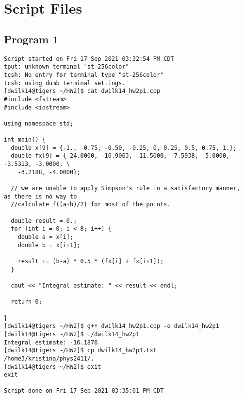\documentclass{article}
\begin{document}
\section*{Script Files}
\subsection*{Program 1}
\begin{verbatim}
Script started on Fri 17 Sep 2021 03:32:54 PM CDT
tput: unknown terminal "st-256color"
tcsh: No entry for terminal type "st-256color"
tcsh: using dumb terminal settings.
[dwilk14@tigers ~/HW2]$ cat dwilk14_hw2p1.cpp
#include <fstream>
#include <iostream>

using namespace std;

int main() {
  double x[9] = {-1., -0.75, -0.50, -0.25, 0, 0.25, 0.5, 0.75, 1.};
  double fx[9] = {-24.0000, -16.9063, -11.5000, -7.5938, -5.0000, -3.5313, -3.0000, \
    -3.2188, -4.0000};

  // we are unable to apply Simpson's rule in a satisfactory manner, as there is no way to 
  //calculate f((a+b)/2) for most of the points.

  double result = 0.;
  for (int i = 0; i < 8; i++) {
    double a = x[i];
    double b = x[i+1];

    result += (b-a) * 0.5 * (fx[i] + fx[i+1]);
  }

  cout << "Integral estimate: " << result << endl;

  return 0;

}
[dwilk14@tigers ~/HW2]$ g++ dwilk14_hw2p1.cpp -o dwilk14_hw2p1
[dwilk14@tigers ~/HW2]$ ./dwilk14_hw2p1
Integral estimate: -16.1876
[dwilk14@tigers ~/HW2]$ cp dwilk14_hw2p1.txt /home3/kristina/phys2411/.
[dwilk14@tigers ~/HW2]$ exit
exit

Script done on Fri 17 Sep 2021 03:35:01 PM CDT

\end{verbatim}
\end{document}
